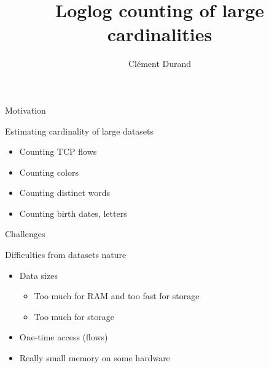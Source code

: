 \documentclass[aspectratio=169]{beamer}
\title[]
      {Loglog counting of large cardinalities}
\author{%
  Cl\'ement Durand%
}
\begin{document}
\maketitle


  \begin{frame}{Motivation}
    \only<+->{\vspace*{.4cm}}
    \begin{center}
      Estimating cardinality of large datasets
    \end{center}\bigskip

    \begin{itemize}[<+-|alert@+>]
      \item Counting TCP flows
      \item Counting colors
      \item Counting distinct words
      \item Counting birth dates, letters
    \end{itemize}
  \end{frame}

  \begin{frame}{Challenges}
    \only<+->{\vspace*{.4cm}}
    \begin{center}
      Difficulties from datasets nature
    \end{center}\bigskip

    \begin{itemize}[<+-|alert@+>]
      \item Data sizes
        \begin{itemize}
          \item Too much for RAM and too fast for storage
          \item Too much for storage
        \end{itemize}
      \item One-time access (flows)
      \item Really small memory on some hardware
    \end{itemize}
  \end{frame}
\end{document}

